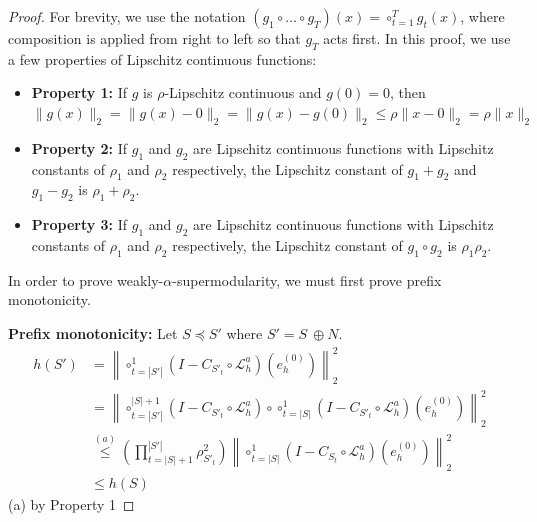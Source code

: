 \documentclass{article} %
\begin{document}
\begin{proof}
For brevity, we use the notation $\left(g_1 \circ \dots \circ g_T\right)(x) = \circ_{t = 1}^{T} g_t(x)$, where composition is applied from right to left so that $g_T$ acts first. In this proof, we use a few properties of Lipschitz continuous functions:
\begin{itemize}
    \item \textbf{Property 1:} If $g$ is $\rho$-Lipschitz continuous and $g(0) = 0$, then $\|g(x)\|_2 = \|g(x) - 0\|_2 = \|g(x) - g(0)\|_2 \leq \rho \|x - 0\|_2 = \rho\|x\|_2$
    \item \textbf{Property 2:} If $g_1$ and $g_2$ are Lipschitz continuous functions with Lipschitz constants of $\rho_1$ and $\rho_2$ respectively, the Lipschitz constant of $g_1 + g_2$ and $g_1 - g_2$ is $\rho_1 + \rho_2$.
    \item \textbf{Property 3:} If $g_1$ and $g_2$ are Lipschitz continuous functions with Lipschitz constants of $\rho_1$ and $\rho_2$ respectively, the Lipschitz constant of $g_1 \circ g_2$ is $\rho_1\rho_2$.
\end{itemize}

In order to prove weakly-$\alpha$-supermodularity, we must first prove prefix monotonicity.

\textbf{Prefix monotonicity: } Let $S \preceq S'$ where $S' = S \ \oplus N$.
\begin{align*}
    h(S') &= \left \|\circ_{t = |S'|}^1\left(I - C_{S'_t} \circ \mathcal{L}_h^a\right) \left(e^{(0)}_h\right)\right\|^2_2 \\
    &= \left \|\circ_{t = |S'|}^{|S| + 1}\left(I - C_{S'_t}  \circ \mathcal{L}_h^a\right)\circ \circ_{t = |S|}^1\left(I - C_{S'_t}  \circ \mathcal{L}_h^a\right) \left(e^{(0)}_h\right)\right\|^2_2 \\
    &\overset{(a)}{\leq}\left( \prod_{t = |S| + 1 }^{|S'|} \rho_{S'_t}^2 \right)\left\|\circ_{t = |S|}^1\left(I - C_{S_t} \circ \mathcal{L}_h^a\right) \left(e^{(0)}_h\right)\right\|^2_2 \\
    &\leq h(S)
\end{align*}
(a) by Property 1



\end{proof}
\end{document}
